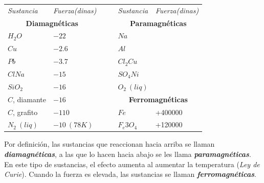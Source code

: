 \begin{table}[H]
\centering
\begin{tabular}{lllll}
\multicolumn{1}{l|}{\textit{Sustancia}} & \textit{Fuerza(dinas)} & \textit{$\quad$} & \multicolumn{1}{l|}{\textit{Sustancia}} & \textit{Fuerza(dinas)} \\
\multicolumn{2}{c}{\textbf{Diamagnéticas}}                       &                  & \multicolumn{2}{c}{\textbf{Paramagnéticas}}                      \\ \cline{1-2} \cline{4-5} 
\multicolumn{1}{l|}{$H_2O$}             & $-22$                  &                  & \multicolumn{1}{l|}{$Na$}               &                        \\
\multicolumn{1}{l|}{$Cu$}               & $-2.6$                 &                  & \multicolumn{1}{l|}{$Al$}               &                        \\
\multicolumn{1}{l|}{$Pb$}               & $-3.7$                 &                  & \multicolumn{1}{l|}{$Cl_2Cu$}           &                        \\
\multicolumn{1}{l|}{$ClNa$}             & $-15$                  &                  & \multicolumn{1}{l|}{$SO_4Ni$}           &                        \\
\multicolumn{1}{l|}{$SiO_2$}            & $-16$                  &                  & \multicolumn{1}{l|}{$O_2\ (liq)$}       &                        \\
\multicolumn{1}{l|}{$C$, diamante}      & $-16$                  &                  & \multicolumn{2}{c}{\textbf{Ferromagnéticas}}                     \\ \cline{4-5} 
\multicolumn{1}{l|}{$C$, grafito}       & $-110$                 &                  & \multicolumn{1}{l|}{$Fe$}               & +400000                \\
\multicolumn{1}{l|}{$N_2\ (liq)$}       & $-10 \ (78 K)$         &                  & \multicolumn{1}{l|}{$F_e3O_4$}          & +120000               
\end{tabular}
\end{table}

Por definición, las sustancias que reaccionan hacia arriba se llaman \emph{\textbf{diamagnéticas}}, a las que lo hacen hacia abajo se les llama \emph{\textbf{paramagnéticas}}. En este tipo de sustancias, el efecto aumenta al aumentar la temperatura (\emph{Ley de Curie}). Cuando la fuerza es elevada, las sustancias se llaman 
\emph{\textbf{ferromagnéticas}}.


